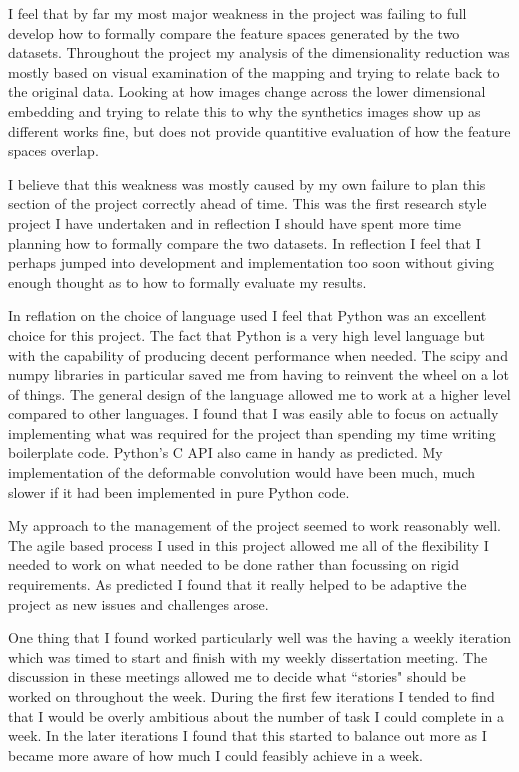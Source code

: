 I feel that by far my most major weakness in the project was failing to full develop how to formally compare the feature spaces generated by the two datasets. Throughout the project my analysis of the dimensionality reduction was mostly based on visual examination of the mapping and trying to relate back to the original data. Looking at how images change across the lower dimensional embedding and trying to relate this to why the synthetics images show up as different works fine, but does not provide quantitive evaluation of how the feature spaces overlap.

I believe that this weakness was mostly caused by my own failure to plan this section of the project correctly ahead of time. This was the first research style project I have undertaken and in reflection I should have spent more time planning how to formally compare the two datasets. In reflection I feel that I perhaps jumped into development and implementation too soon without giving enough thought as to how to formally evaluate my results. 

In reflation on the choice of language used I feel that Python was an excellent choice for this project. The fact that Python is a very high level language but with the capability of producing decent performance when needed. The scipy and numpy libraries in particular saved me from having to reinvent the wheel on a lot of things. The general design of the language allowed me to work at a higher level compared to other languages. I found that I was easily able to focus on actually implementing what was required for the project than spending my time writing boilerplate code. Python's C API also came in handy as predicted. My implementation of the deformable convolution would have been much, much slower if it had been implemented in pure Python code.

My approach to the management of the project seemed to work reasonably well. The agile based process I used in this project allowed me all of the flexibility I needed to work on what needed to be done rather than focussing on rigid requirements. As predicted I found that it really helped to be adaptive the project as new issues and challenges arose.

One thing that I found worked particularly well was the having a weekly iteration which was timed to start and finish with my weekly dissertation meeting. The discussion in these meetings allowed me to decide what ``stories" should be worked on throughout the week. During the first few iterations I tended to find that I would be overly ambitious about the number of task I could complete in a week. In the later iterations I found that this started to balance out more as I became more aware of how much I could feasibly achieve in a week.

